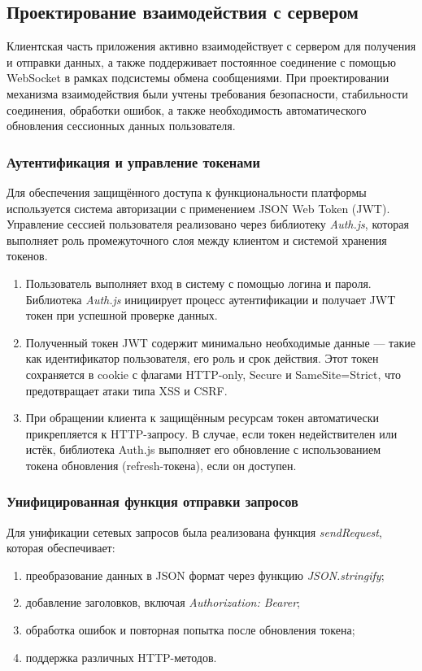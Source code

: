 \subsection{Проектирование взаимодействия с сервером}

Клиентская часть приложения активно взаимодействует с сервером для получения и отправки данных, а также поддерживает постоянное соединение с помощью WebSocket в рамках подсистемы обмена сообщениями. При проектировании механизма взаимодействия были учтены требования безопасности, стабильности соединения, обработки ошибок, а также необходимость автоматического обновления сессионных данных пользователя.

\subsubsection{Аутентификация и управление токенами}
Для обеспечения защищённого доступа к функциональности платформы используется система авторизации с применением JSON Web Token (JWT). Управление сессией пользователя реализовано через библиотеку \textit{Auth.js}, которая выполняет роль промежуточного слоя между клиентом и системой хранения токенов.

\begin{enumerate}
  \item Пользователь выполняет вход в систему с помощью логина и пароля. Библиотека \textit{Auth.js} инициирует процесс аутентификации и получает JWT токен при успешной проверке данных.
  \item Полученный токен JWT содержит минимально необходимые данные — такие как идентификатор пользователя, его роль и срок действия. Этот токен сохраняется в cookie с флагами HTTP-only, Secure и SameSite=Strict, что предотвращает атаки типа XSS и CSRF.
  \item При обращении клиента к защищённым ресурсам токен автоматически прикрепляется к HTTP-запросу. В случае, если токен недействителен или истёк, библиотека Auth.js выполняет его обновление с использованием токена обновления (refresh-токена), если он доступен.
\end{enumerate}

\subsubsection{Унифицированная функция отправки запросов}
Для унификации сетевых запросов была реализована функция \textit{sendRequest}, которая обеспечивает:

\begin{enumerate}
  \item преобразование данных в JSON формат через функцию \textit{JSON.stringify};
  \item добавление заголовков, включая \textit{Authorization: Bearer};
  \item обработка ошибок и повторная попытка после обновления токена;
  \item поддержка различных HTTP-методов.
\end{enumerate}

